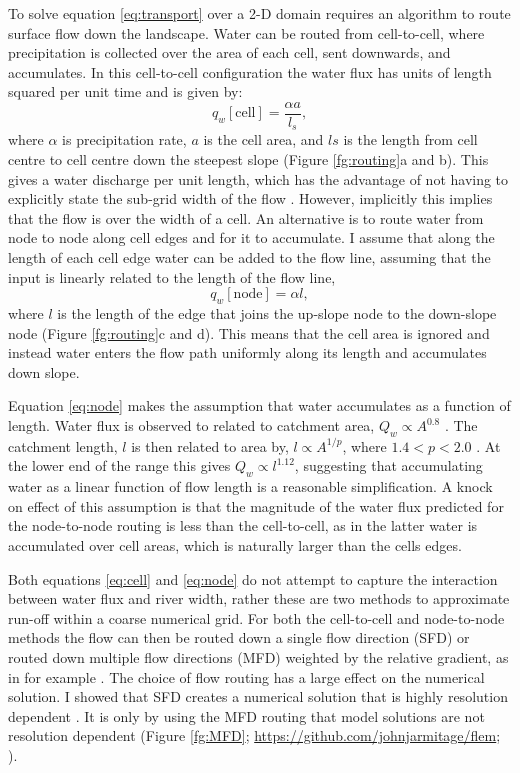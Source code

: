 To solve equation \ref{eq:transport} over a 2-D domain requires an algorithm to route surface flow down the landscape. Water can be routed from cell-to-cell, where precipitation is collected over the area of each cell, sent downwards, and accumulates. In this cell-to-cell configuration the water flux has units of length squared per unit time and is given by: 
\begin{equation}
q_{w}\mathrm{[cell]} = \frac{\alpha a}{l_{s}},
\label{eq:cell}
\end{equation}
where $\alpha$ is precipitation rate, $a$ is the cell area, and $l{s}$ is the length from cell centre to cell centre down the steepest slope (Figure \ref{fg:routing}a and b). This gives a water discharge per unit length, which has the advantage of not having to explicitly state the sub-grid width of the flow \citep{simpson-2003}. However, implicitly this implies that the flow is over the width of a cell. An alternative is to route water from node to node along cell edges and for it to accumulate. I assume that along the length of each cell edge water can be added to the flow line, assuming that the input is linearly related to the length of the flow line, 
\begin{equation}
q_{w}\mathrm{[node]} = \alpha l,
\label{eq:node}
\end{equation}
where $l$ is the length of the edge that joins the up-slope node to the down-slope node (Figure \ref{fg:routing}c and d). This means that the cell area is ignored and instead water enters the flow path uniformly along its length and accumulates down slope.

Equation \ref{eq:node} makes the assumption that water accumulates as a function of length. Water flux is observed to related to catchment area, $Q_{w} \propto A^{0.8}$ \citep{syvitski-2007}. The catchment length, $l$ is then related to area by, $l\propto A^{1/p}$, where $1.4<p<2.0$ \citep{armitage-etal-esurf-2018}. At the lower end of the range this gives $Q_{w} \propto l^{1.12}$, suggesting that accumulating water as a linear function of flow length is a reasonable simplification. A knock on effect of this assumption is that the magnitude of the water flux predicted for the node-to-node routing is less than the cell-to-cell, as in the latter water is accumulated over cell areas, which is naturally larger than the cells edges.

Both equations \ref{eq:cell} and \ref{eq:node} do not attempt to capture the interaction between water flux and river width, rather these are two methods to approximate run-off within a coarse numerical grid. For both the cell-to-cell and node-to-node methods the flow can then be routed down a single flow direction (SFD) or routed down multiple flow directions (MFD) weighted by the relative gradient, as in for example \cite{schoorl-etal-2000}. The choice of flow routing has a large effect on the numerical solution. I showed that SFD creates a numerical solution that is highly resolution dependent \citep{armitage-2019}. It is only by using the MFD routing that model solutions are not resolution dependent (Figure \ref{fg:MFD}; \url{https://github.com/johnjarmitage/flem}; \citealp{armitage-2019}).

